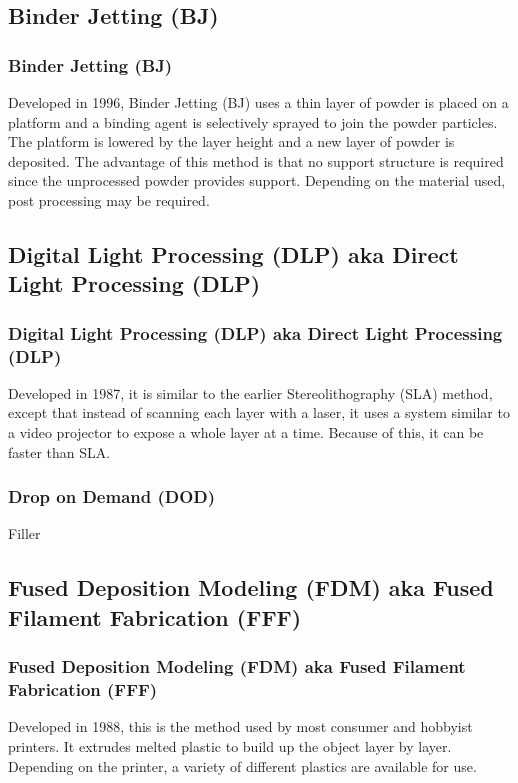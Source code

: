 \documentclass[english,10pt]{beamer}
\begin{document}
\subsection{Binder Jetting (BJ)}
\begin{frame}
  \frametitle{Binder Jetting (BJ)}
  Developed in 1996, Binder Jetting (BJ) uses a thin layer of powder is placed on a platform and a binding agent is selectively sprayed to join the powder particles.  The platform is lowered by the layer height and a new layer of powder is deposited.  The advantage of this method is that no support structure is required since the unprocessed powder provides support.  Depending on the material used, post processing may be required.
\end{frame}

\subsection{Digital Light Processing (DLP) aka Direct Light Processing (DLP)}
\begin{frame}
  \frametitle{Digital Light Processing (DLP) aka Direct Light Processing (DLP)}
  Developed in 1987, it is similar to the earlier Stereolithography (SLA) method, except that instead of scanning each layer with a laser, it uses a system similar to a video projector to expose a whole layer at a time.  Because of this, it can be faster than SLA.
\end{frame}

\begin{frame}
  \frametitle{Drop on Demand (DOD)}
  Filler
\end{frame}

\subsection{Fused Deposition Modeling (FDM) aka Fused Filament Fabrication (FFF)}
\begin{frame}
  \frametitle{Fused Deposition Modeling (FDM) aka Fused Filament Fabrication (FFF)}
  Developed in 1988, this is the method used by most consumer and hobbyist printers.  It extrudes melted plastic to build up the object layer by layer.  Depending on the printer, a variety of different plastics are available for use.
\end{frame}
\end{document}
